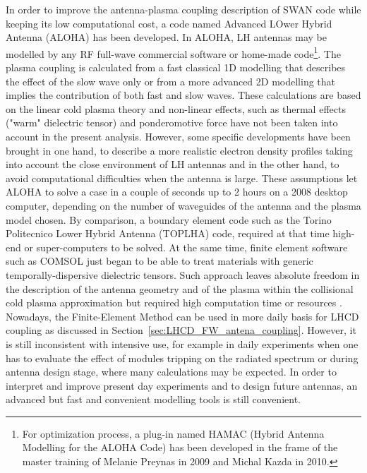 In order to improve the antenna-plasma coupling description of SWAN code while keeping its low computational cost, a code named Advanced LOwer Hybrid Antenna (ALOHA) has been developed. In ALOHA, LH antennas may be modelled by any RF full-wave commercial software or home-made code\footnote{For optimization process, a plug-in named HAMAC (Hybrid Antenna Modelling for the ALOHA Code) has been developed in the frame of the master training of Melanie Preynas in 2009 and Michal Kazda in 2010.}. The plasma coupling is calculated from a fast classical 1D modelling that describes the effect of the slow wave only\cite{brambilla1976-1} or from a more advanced 2D modelling that implies the contribution of both fast and slow waves\cite{brambilla1979, bers1983, irzak1995}.
These calculations are based on the linear cold plasma theory and non-linear effects, such as thermal effects ("warm" dielectric tensor) and ponderomotive force have not been taken into account in the present analysis. However, some specific developments have been brought in one hand, to describe a more realistic electron density profiles taking into account the close environment of LH antennas and in the other hand, to avoid computational difficulties when the antenna is large. These assumptions let ALOHA to solve a case in a couple of seconds up to 2 hours on a 2008 desktop computer, depending on the number of waveguides of the antenna and the plasma model chosen. By comparison, a boundary element code such as the Torino Politecnico Lower Hybrid Antenna (TOPLHA) code, required at that time high-end or super-computers to be solved. At the same time, finite element software such as COMSOL just began to be able to treat materials with generic temporally-dispersive dielectric tensors. Such approach leaves absolute freedom in the description of the antenna geometry and of the plasma within the collisional cold plasma approximation but required high computation time or resources . Nowadays, the Finite-Element Method can be used in more daily basis for LHCD coupling as discussed in Section~\ref{sec:LHCD_FW_antena_coupling}. However, it is still inconsistent with intensive use, for example in daily experiments when one has to evaluate the effect of modules tripping on the radiated spectrum or during antenna design stage, where many calculations may be expected. In order to interpret and improve present day experiments and to design future antennas, an advanced but fast and convenient modelling tools is still convenient.

